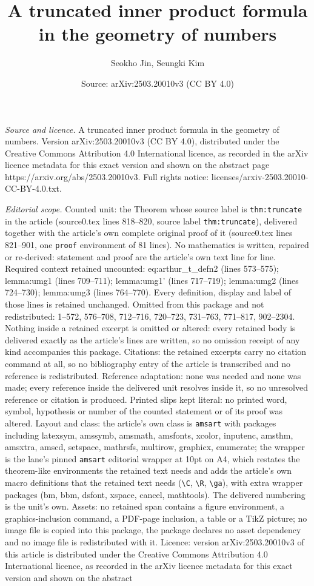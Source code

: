 \documentclass[10pt,a4paper]{amsart}
\title[A truncated inner product formula in the geometry of numbers]{A truncated inner product formula in the geometry of numbers}
\author{Seokho Jin, Seungki Kim}
\date{Source: arXiv:2503.20010v3 (CC BY 4.0)}
\begin{document}
\maketitle

\noindent\emph{Source and licence.} A truncated inner product formula in the geometry of numbers. Version arXiv:2503.20010v3 (CC BY 4.0), distributed under the Creative Commons Attribution 4.0 International licence, as recorded in the arXiv licence metadata for this exact version and shown on the abstract page https://arxiv.org/abs/2503.20010v3. Full rights notice: licenses/arxiv-2503.20010-CC-BY-4.0.txt.\par\smallskip

\noindent\textit{Editorial scope.} Counted unit: the Theorem whose source label is \texttt{thm:truncate} in the article (source0.tex lines 818--820, source label \texttt{thm:truncate}), delivered together with the article's own complete original proof of it (source0.tex lines 821--901, one \texttt{proof} environment of 81 lines). No mathematics is written, repaired or re-derived: statement and proof are the article's own text line for line. Required context retained uncounted: eq:arthur\_t\_defn2 (lines 573--575); lemma:umg1 (lines 709--711); lemma:umg1' (lines 717--719); lemma:umg2 (lines 724--730); lemma:umg3 (lines 764--770). Every definition, display and label of those lines is retained unchanged. Omitted from this package and not redistributed: 1--572, 576--708, 712--716, 720--723, 731--763, 771--817, 902--2304. Nothing inside a retained excerpt is omitted or altered: every retained body is delivered exactly as the article's lines are written, so no omission receipt of any kind accompanies this package. Citations: the retained excerpts carry no citation command at all, so no bibliography entry of the article is transcribed and no reference is redistributed. Reference adaptation: none was needed and none was made; every reference inside the delivered unit resolves inside it, so no unresolved reference or citation is produced. Printed slips kept literal: no printed word, symbol, hypothesis or number of the counted statement or of its proof was altered. Layout and class: the article's own class is \texttt{amsart} with packages including latexsym, amssymb, amsmath, amsfonts, xcolor, inputenc, amsthm, amsxtra, amscd, setspace, mathrsfs, multirow, graphicx, enumerate; the wrapper is the lane's pinned \texttt{amsart} editorial wrapper at 10pt on A4, which restates the theorem-like environments the retained text needs and adds the article's own macro definitions that the retained text needs (\texttt{\textbackslash C}, \texttt{\textbackslash R}, \texttt{\textbackslash ga}), with extra wrapper packages (bm, bbm, dsfont, xspace, cancel, mathtools). The delivered numbering is the unit's own. Assets: no retained span contains a figure environment, a graphics-inclusion command, a PDF-page inclusion, a table or a TikZ picture; no image file is copied into this package, the package declares no asset dependency and no image file is redistributed with it. Licence: version arXiv:2503.20010v3 of this article is distributed under the Creative Commons Attribution 4.0 International licence, as recorded in the arXiv licence metadata for this exact version and shown on the abstract 
\end{document}
